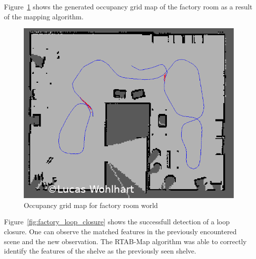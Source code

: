\documentclass[10pt,journal,compsoc]{IEEEtran}
\begin{document}
Figure~\ref{fig:factory_occupancy_grid} shows the generated occupancy grid map of the factory room as a result of the mapping algorithm.

\begin{figure}[thpb]
      \centering
      \includegraphics[width=\linewidth]{img/factory_occupancy_grid}
      \caption{Occupancy grid map for factory room world}
      \label{fig:factory_occupancy_grid}
\end{figure}

Figure~\ref{fig:factory_loop_closure} shows the successfull detection of a loop closure. One can observe the matched features in the previously encountered scene and the new observation. The RTAB-Map algorithm was able to correctly identify the features of the shelve as the previously seen shelve.
\end{document}
